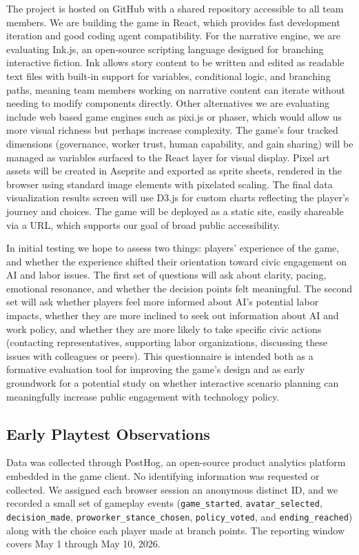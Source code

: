 \documentclass[sigconf,authordraft]{acmart}
\begin{document}
The project is hosted on GitHub with a shared repository accessible to all team members. We are building the game in React, which provides fast development iteration and good coding agent compatibility. For the narrative engine, we are evaluating Ink.js, an open-source scripting language designed for branching interactive fiction. Ink allows story content to be written and edited as readable text files with built-in support for variables, conditional logic, and branching paths, meaning team members working on narrative content can iterate without needing to modify components directly. Other alternatives we are evaluating include web based game engines such as pixi.js or phaser, which would allow us more visual richness but perhaps increase complexity. The game's four tracked dimensions (governance, worker trust, human capability, and gain sharing) will be managed as variables surfaced to the React layer for visual display. Pixel art assets will be created in Aseprite and exported as sprite sheets, rendered in the browser using standard image elements with pixelated scaling. The final data visualization results screen will use D3.js for custom charts reflecting the player's journey and choices. The game will be deployed as a static site, easily shareable via a URL, which supports our goal of broad public accessibility.

In initial testing we hope to assess two things: players' experience of the game, and whether the experience shifted their orientation toward civic engagement on AI and labor issues. The first set of questions will ask about clarity, pacing, emotional resonance, and whether the decision points felt meaningful. The second set will ask whether players feel more informed about AI's potential labor impacts, whether they are more inclined to seek out information about AI and work policy, and whether they are more likely to take specific civic actions (contacting representatives, supporting labor organizations, discussing these issues with colleagues or peers). This questionnaire is intended both as a formative evaluation tool for improving the game's design and as early groundwork for a potential study on whether interactive scenario planning can meaningfully increase public engagement with technology policy.


\subsection{Early Playtest Observations}

Data was collected through PostHog, an open-source product analytics platform embedded in the game client. No identifying information was requested or collected. We assigned each browser session an anonymous distinct ID, and we recorded a small set of gameplay events (\texttt{game\_started}, \texttt{avatar\_selected}, \texttt{decision\_made}, \texttt{proworker\_stance\_chosen}, \texttt{policy\_voted}, and \texttt{ending\_reached}) along with the choice each player made at branch points. The reporting window covers May 1 through May 10, 2026.
\end{document}
